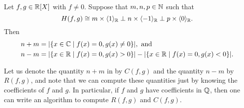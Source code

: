 \documentclass[12pt, leqno, british]{amsart}
\begin{document}
\begin{thm}\label{T:Hermite}
Let $f, g \in \mathbb R[X]$ with $f \neq 0$.
Suppose that $m, n, p \in \mathbb N$ such that
$$ H(f, g) \cong m \times \langle 1 \rangle_\mathbb R \perp n \times \langle -1 \rangle_\mathbb R \perp p \times \langle 0 \rangle_\mathbb R.$$
Then
\begin{align*}
n + m &= \lvert \lbrace x \in \mathbb C \mid f(x) = 0, g(x) \neq 0 \rbrace \rvert, \text{ and} \\
n - m &=  \lvert \lbrace x \in \mathbb R \mid f(x) = 0, g(x) > 0 \rbrace \rvert - \lvert \lbrace x \in \mathbb R \mid f(x) = 0, g(x) < 0 \rbrace \rvert.
\end{align*}
\end{thm}
Let us denote the quantity $n+m$ in  by $C(f, g)$ and the quantity $n-m$ by $R(f, g)$, and note that we can compute these quantities just by knowing the coefficients of $f$ and $g$.
In particular, if $f$ and $g$ have coefficients in $\mathbb Q$, then one can write an algorithm to compute $R(f, g)$ and $C(f, g)$.
\end{document}
